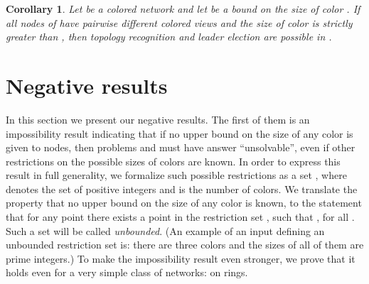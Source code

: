 \documentclass[a4paper,10pt]{article}
\newtheorem{corollary}{Corollary}[section]
\newcommand{\qed}{\hfill  \smallbreak}
\begin{document}
\begin{corollary} \label{cor:main}
Let  be a colored network and let  be a bound on the size of color .
If all nodes of  have pairwise different colored views and the size of color  is strictly greater than , then topology recognition and leader election are possible in .
\qed
\end{corollary}


\section{Negative results}

In this section we present our negative results. The first of them {is an impossibility result indicating} that if no upper bound on the size of any color is given to nodes, then problems  and  must have answer ``unsolvable'', even if other restrictions on the possible sizes of colors are known. In order to express this result in full generality, we formalize such possible restrictions as a set , where  denotes the set of positive integers and  is the number of colors.
We translate the property that no upper bound on the size of any color is known, to the statement
that for any point  there exists a point   in the restriction set , such that , for all .
Such a set  will be called \emph{unbounded}.
(An example of an input defining an unbounded restriction set is: there are three colors and the sizes of all of them are prime integers.)
To make the impossibility result even stronger, we prove that it holds even for a very simple class of networks: on rings. 
\end{document}
